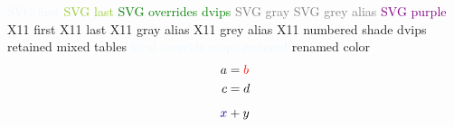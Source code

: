 \documentclass{article}
\begin{document}
\textcolor{AliceBlue}{SVG first}
\textcolor{YellowGreen}{SVG last}
\textcolor{Green}{SVG overrides dvips}
\textcolor{Gray}{SVG gray}
\textcolor{Grey}{SVG grey alias}
\textcolor{Purple}{SVG purple}
\textcolor{AntiqueWhite1}{X11 first}
\textcolor{Purple0}{X11 last}
\textcolor{Gray0}{X11 gray alias}
\textcolor{Grey0}{X11 grey alias}
\textcolor{Blue4}{X11 numbered shade}
\textcolor{Apricot}{dvips retained}
\textcolor{AliceBlue!50!Blue4}{mixed tables}
{\textcolor{AliceBlue}{local override}}
\textcolor{AliceBlue}{scope restored}
\textcolor{B6Alias}{renamed color}
\begin{equation}\begin{aligned}a&=\textcolor{AliceBlue}{b}\\c&=d\end{aligned}\end{equation}
\[\textcolor{Blue4}{x}+y\]
\end{document}
